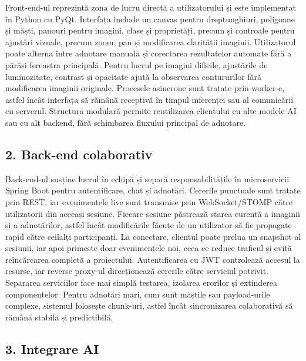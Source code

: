 \documentclass[10pt,a4paper]{article}
\begin{document}
\hspace*{2em}Front-end-ul reprezintă zona de lucru directă a utilizatorului și este implementat în Python cu PyQt. Interfața include un canvas pentru dreptunghiuri, poligoane și măști, panouri pentru imagini, clase și proprietăți, precum și controale pentru ajustări vizuale, precum zoom, pan și modificarea clarității imaginii. Utilizatorul poate alterna între adnotare manuală și corectarea rezultatelor automate fără a părăsi fereastra principală. Pentru lucrul pe imagini dificile, ajustările de luminozitate, contrast și opacitate ajută la observarea contururilor fără modificarea imaginii originale. Procesele asincrone sunt tratate prin worker-e, astfel încât interfața să rămână receptivă în timpul inferenței sau al comunicării cu serverul. Structura modulară permite reutilizarea clientului cu alte modele AI sau cu alt backend, fără schimbarea fluxului principal de adnotare.

\subsection*{2. Back-end colaborativ}

\hspace*{2em}Back-end-ul susține lucrul în echipă și separă responsabilitățile în microservicii Spring Boot pentru autentificare, chat și adnotări. Cererile punctuale sunt tratate prin REST, iar evenimentele live sunt transmise prin WebSocket/STOMP către utilizatorii din aceeași sesiune. Fiecare sesiune păstrează starea curentă a imaginii și a adnotărilor, astfel încât modificările făcute de un utilizator să fie propagate rapid către ceilalți participanți. La conectare, clientul poate prelua un snapshot al sesiunii, iar apoi primește doar evenimentele noi, ceea ce reduce traficul și evită reîncărcarea completă a proiectului. Autentificarea cu JWT controlează accesul la resurse, iar reverse proxy-ul direcționează cererile către serviciul potrivit. Separarea serviciilor face mai simplă testarea, izolarea erorilor și extinderea componentelor. Pentru adnotări mari, cum sunt măștile sau payload-urile complexe, sistemul folosește chunk-uri, astfel încât sincronizarea colaborativă să rămână stabilă și predictibilă.

\subsection*{3. Integrare AI}
\end{document}
